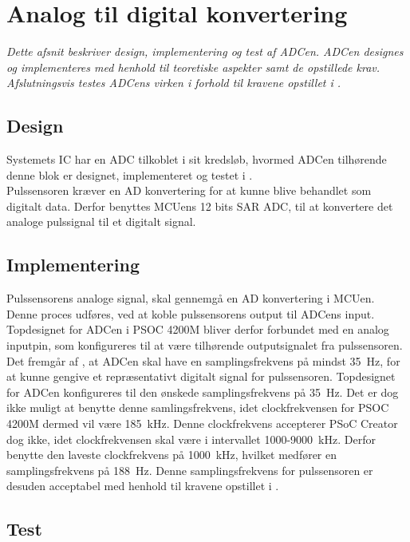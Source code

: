 \section{Analog til digital konvertering}
\textit{Dette afsnit beskriver design, implementering og test af ADCen. ADCen designes og implementeres med henhold til teoretiske aspekter samt de opstillede krav. Afslutningsvis testes ADCens virken i forhold til kravene opstillet i .}

\subsection{Design}
Systemets IC har en ADC tilkoblet i sit kredsløb, hvormed ADCen tilhørende denne blok er designet, implementeret og testet i .\\
Pulssensoren kræver en AD konvertering for at kunne blive behandlet som digitalt data. Derfor benyttes MCUens 12 bits SAR ADC, til at konvertere det analoge pulssignal til et digitalt signal. 


\subsection{Implementering}
Pulssensorens analoge signal, skal gennemgå en AD konvertering i MCUen. Denne proces udføres, ved at koble pulssensorens output til ADCens input. Topdesignet for ADCen i PSOC 4200M bliver derfor forbundet med en analog inputpin, som konfigureres til at være tilhørende outputsignalet fra pulssensoren. \\
Det fremgår af , at ADCen skal have en samplingsfrekvens på mindst 35~Hz, for at kunne gengive et repræsentativt digitalt signal for pulssensoren. Topdesignet for ADCen konfigureres til den ønskede samplingsfrekvens på 35~Hz. Det er dog ikke muligt at benytte denne samlingsfrekvens, idet clockfrekvensen for PSOC 4200M dermed vil være 185~kHz. Denne clockfrekvens accepterer PSoC Creator dog ikke, idet clockfrekvensen skal være i intervallet 1000-9000~kHz. Derfor benytte den laveste clockfrekvens på 1000~kHz, hvilket medfører en samplingsfrekvens på 188~Hz. Denne samplingsfrekvens for pulssensoren er desuden acceptabel med henhold til kravene opstillet i . 


\subsection{Test}

